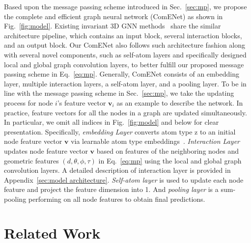 \documentclass{article}
\begin{document}
Based upon the message passing scheme introduced in Sec.~\ref{sec:mp}, 
we propose the complete and efficient graph neural network (ComENet) as shown in Fig.~\ref{fig:model}. 
\textcolor{COLOR}{Existing invariant 3D GNN methods~\cite{schmidhuber2015deep,klicpera_dimenet_2020,klicpera_dimenetpp_2020,liu2022spherical,klicpera2021gemnet,schutt2021equivariant}
share the similar architecture pipeline, which contains an input block, several interaction blocks, and an output block.
Our ComENet also follows such architecture fashion along with several novel components, such as self-atom layers and specifically designed local and global graph convolution layers, to better fulfill our proposed message passing scheme in Eq.~\ref{eq:mp}.}
Generally, ComENet consists of an embedding layer, multiple interaction layers, a self-atom layer, and a pooling layer. To be in line with the message passing scheme in Sec.~\ref{sec:mp},
we take the updating process for node $i$'s feature vector $\textbf{v}_i$
as an example to describe the network. \textcolor{COLOR}{In practice, feature vectors for all the nodes in a graph are updated simultaneously.}
In particular, we omit all indices in Fig.~\ref{fig:model} and below for clear presentation.
Specifically, \textit{embedding Layer} converts atom type z to an initial node feature vector \textcolor{COLOR}{$\textbf{v}$} via learnable atom type embeddings~\cite{schutt2017schnet,klicpera_dimenet_2020}.
\textit{Interaction Layer} updates node feature vector $\textbf{v}$ based on features of the neighboring nodes and geometric features $(d,\theta,\phi,\tau)$ in Eq.~\ref{eq:mp} using the local and global graph convolution layers. A detailed description of interaction layer is provided in Appendix~\ref{sec:model architecture}.
\textit{Self-atom layer} is used to update each node feature and project the feature dimension into 1. 
And \textit{pooling layer} is a sum-pooling performing on all node features to obtain final predictions.


\section{Related Work}
\end{document}
